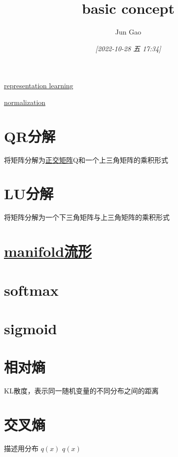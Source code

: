\documentclass[11pt]{article}
\author{Jun Gao}
\date{\textit{[2022-10-28 五 17:34]}}
\title{basic concept}
\begin{document}
\maketitle
\tableofcontents

\href{20221028173756.org}{representation learning}

\href{20221028174331.org}{normalization}

\section{QR分解}
\label{sec:orgceb4e2f}
将矩阵分解为\href{20221028175310.org}{正交矩阵}Q和一个上三角矩阵的乘积形式

\section{LU分解}
\label{sec:org313a44f}
将矩阵分解为一个下三角矩阵与上三角矩阵的乘积形式

\section{\href{20221028175536.org}{manifold流形}}
\label{sec:orgfa2ae31}

\section{softmax}
\label{sec:orgd8707d9}

\section{sigmoid}
\label{sec:org6240df0}

\section{相对熵}
\label{sec:org4f90000}
KL散度，表示同一随机变量的不同分布之间的距离

\section{交叉熵}
\label{sec:org4eef4ea}
描述用分布 \(q(x)\)
$q(x)$
\end{document}
